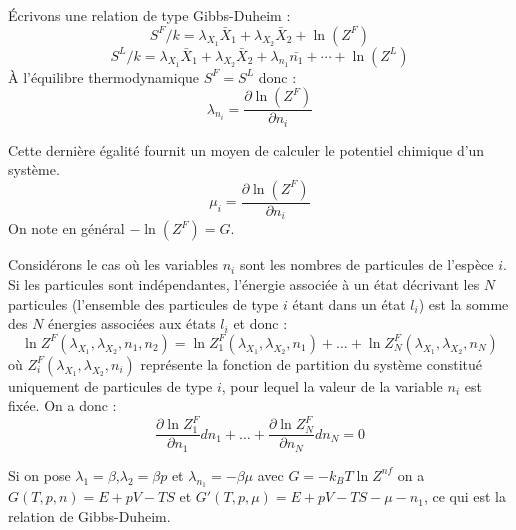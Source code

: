 \documentclass[12pt]{book}
\begin{document}
\'Ecrivons une relation de type Gibbs-Duheim :
\begin{equation}
S^{F}/k=\lambda_{X_1}\bar X_1+\lambda_{X_2}\bar X_2+\ln (Z^{F})
\end{equation}
\begin{equation}
S^{L}/k=\lambda_{X_1}\bar X_1+\lambda_{X_2}\bar X_2+\lambda_{n_1}\bar{n_1}+\cdots+\ln (Z^{L})
\end{equation}
\`A l'\'equilibre thermodynamique $S^{F}=S^{L}$ donc :
\begin{equation}
\lambda_{n_i}=\frac{\partial \ln (Z^{F})}{\partial n_i}
\end{equation}
\begin{exmp}
Cette derni\`ere \'egalit\'e fournit un moyen de calculer le potentiel
chimique d'un syst\`eme.
\begin{equation}
\mu_i=\frac{\partial \ln (Z^{F})}{\partial n_i}
\end{equation}
On note en g\'en\'eral $-\ln(Z^{F})=G$.
\end{exmp}
\begin{exmp}
Consid\'erons le cas o\`u les variables $n_i$ sont les nombres de
particules de l'esp\`ece $i$.
Si les particules sont ind\'ependantes, l'\'energie associ\'ee \`a un
\'etat d\'ecrivant les $N$ particules (l'ensemble des particules de type $i$
\'etant dans un \'etat $l_i$) est la somme des $N$ \'energies associ\'ees aux
\'etats $l_i$ et donc :
\begin{equation}
\ln Z^F(\lambda_{X_1},\lambda_{X_2},n_1,n_2)=\ln
Z^F_1(\lambda_{X_1},\lambda_{X_2},n_1)+\dots+\ln
Z^F_N(\lambda_{X_1},\lambda_{X_2},n_N) 
\end{equation}
o\`u $Z^F_i(\lambda_{X_1},\lambda_{X_2},n_i)$ repr\'esente la fonction
de partition du syst\`eme constitu\'e uniquement de particules de type
$i$, pour lequel la valeur de la variable $n_i$ est fix\'ee. 
On a donc :
\begin{equation}
\frac{\partial \ln Z^F_1}{\partial n_1} dn_1+\dots+\frac{\partial \ln
Z^F_N}{\partial n_N} dn_N=0 
\end{equation}
\end{exmp}
\begin{rem}
Si on pose $\lambda_1=\beta$,$\lambda_2=\beta p$ et $\lambda_{n_1}=-\beta\mu$ avec $G=-k_BT\ln Z^{nf}$ on a $G(T,p,n)=E+pV-TS$ et $G'(T,p,\mu)=E+pV-TS-\mu-{n_1}$, ce qui est la relation de Gibbs-Duheim.
\end{rem}
\end{document}

